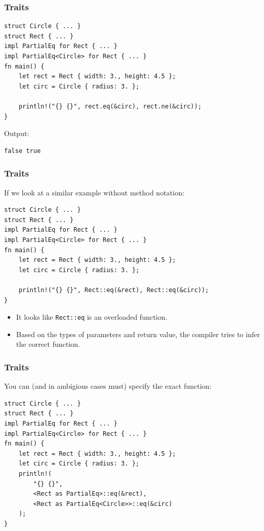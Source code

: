 \begin{frame}[fragile]
    \frametitle{Traits}
    \begin{verbatim}
struct Circle { ... }
struct Rect { ... }
impl PartialEq for Rect { ... }
impl PartialEq<Circle> for Rect { ... }
fn main() {
    let rect = Rect { width: 3., height: 4.5 };
    let circ = Circle { radius: 3. };

    println!("{} {}", rect.eq(&circ), rect.ne(&circ));
}
    \end{verbatim}
    \vfill
    Output:
    \pause
    \vfill
    \begin{verbatim}
false true
    \end{verbatim}
\end{frame}

\begin{frame}[fragile]
    \frametitle{Traits}
    If we look at a similar example without method notation:
    \vfill
    \begin{verbatim}
struct Circle { ... }
struct Rect { ... }
impl PartialEq for Rect { ... }
impl PartialEq<Circle> for Rect { ... }
fn main() {
    let rect = Rect { width: 3., height: 4.5 };
    let circ = Circle { radius: 3. };

    println!("{} {}", Rect::eq(&rect), Rect::eq(&circ));
}
    \end{verbatim}
    \pause
    \vfill
    \begin{itemize}
        \item It looks like \texttt{Rect::eq} is an overloaded function.
        \item Based on the types of parameters and return value, the compiler tries to infer the correct function.
    \end{itemize}
\end{frame}

\begin{frame}[fragile]
    \frametitle{Traits}
    You can (and in ambigious cases must) specify the exact function:
    \vfill
    \begin{verbatim}
struct Circle { ... }
struct Rect { ... }
impl PartialEq for Rect { ... }
impl PartialEq<Circle> for Rect { ... }
fn main() {
    let rect = Rect { width: 3., height: 4.5 };
    let circ = Circle { radius: 3. };
    println!(
        "{} {}",
        <Rect as PartialEq>::eq(&rect),
        <Rect as PartialEq<Circle>>::eq(&circ)
    );
}
    \end{verbatim}
\end{frame}

